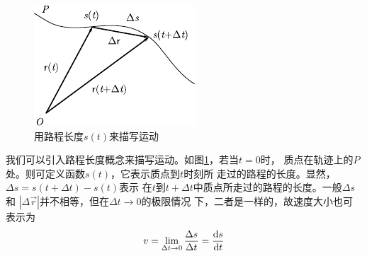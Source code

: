 \setlength{\mathindent}{6em}
\begin{figure}
    \vspace{-6em}
    \centering
    \small
    \includegraphics{figure/fig01.13}
    \caption{用路程长度$s(t)$来描写运动}
    \label{fig:01.13}
\end{figure}
\noindent 我们可以引入路程长度概念来描写运动。如图\ref{fig:01.13}，若当$t=0$时，
质点在轨迹上的$P$处。则可定义函数$s(t)$，它表示质点到$t$时刻所
走过的路程的长度。显然，$\Delta s=s(t+\Delta t)-s(t)$表示
在$t$到$t+\Delta t$中质点所走过的路程的长度。一般$\Delta s$和
$|\Delta \vec{r}|$并不相等，但在$\Delta t \rightarrow 0$的极限情况
下，二者是一样的，故速度大小也可表示为
\begin{equation}\label{eqn:01.07.05}
    v=\lim_{\Delta t \rightarrow 0}\frac{\Delta s}{\Delta t}=\frac{{\rm d} s}{{\rm d} t}
\end{equation}

